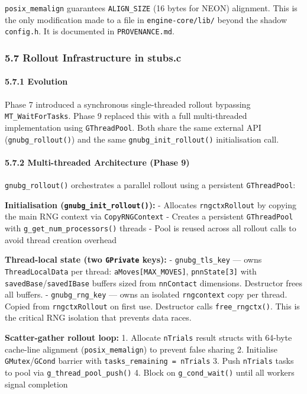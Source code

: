 \documentclass[11pt,a4paper]{article}
\begin{document}
\texttt{posix\_memalign} guarantees \texttt{ALIGN\_SIZE} (16 bytes for
NEON) alignment. This is the only modification made to a file in
\texttt{engine-core/lib/} beyond the shadow \texttt{config.h}. It is
documented in \texttt{PROVENANCE.md}.

\subsubsection{5.7 Rollout Infrastructure in
stubs.c}\label{rollout-infrastructure-in-stubs.c}

\paragraph{5.7.1 Evolution}\label{evolution}

Phase 7 introduced a synchronous single-threaded rollout bypassing
\texttt{MT\_WaitForTasks}. Phase 9 replaced this with a full
multi-threaded implementation using \texttt{GThreadPool}. Both share the
same external API (\texttt{gnubg\_rollout()}) and the same
\texttt{gnubg\_init\_rollout()} initialisation call.

\paragraph{5.7.2 Multi-threaded Architecture (Phase
9)}\label{multi-threaded-architecture-phase-9}

\texttt{gnubg\_rollout()} orchestrates a parallel rollout using a
persistent \texttt{GThreadPool}:

\textbf{Initialisation (\texttt{gnubg\_init\_rollout()}):} - Allocates
\texttt{rngctxRollout} by copying the main RNG context via
\texttt{CopyRNGContext} - Creates a persistent \texttt{GThreadPool} with
\texttt{g\_get\_num\_processors()} threads - Pool is reused across all
rollout calls to avoid thread creation overhead

\textbf{Thread-local state (two \texttt{GPrivate} keys):} -
\texttt{gnubg\_tls\_key} --- owns \texttt{ThreadLocalData} per thread:
\texttt{aMoves{[}MAX\_MOVES{]}}, \texttt{pnnState{[}3{]}} with
\texttt{savedBase}/\texttt{savedIBase} buffers sized from
\texttt{nnContact} dimensions. Destructor frees all buffers. -
\texttt{gnubg\_rng\_key} --- owns an isolated \texttt{rngcontext} copy
per thread. Copied from \texttt{rngctxRollout} on first use. Destructor
calls \texttt{free\_rngctx()}. This is the critical RNG isolation that
prevents data races.

\textbf{Scatter-gather rollout loop:} 1. Allocate \texttt{nTrials}
result structs with 64-byte cache-line alignment
(\texttt{posix\_memalign}) to prevent false sharing 2. Initialise
\texttt{GMutex}/\texttt{GCond} barrier with
\texttt{tasks\_remaining\ =\ nTrials} 3. Push \texttt{nTrials} tasks to
pool via \texttt{g\_thread\_pool\_push()} 4. Block on
\texttt{g\_cond\_wait()} until all workers signal completion
\end{document}
